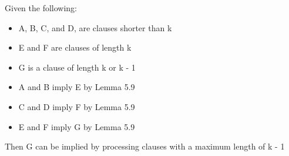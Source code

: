 \documentclass[manuscript]{acmart}
\begin{document}
    \begin{lemma}
        Given the following:
        \begin{itemize}
            \item A, B, C, and D, are clauses shorter than k
            \item E and F are clauses of length k
            \item G is a clause of length k or k - 1
            \item A and B imply E by Lemma 5.9
            \item C and D imply F by Lemma 5.9
            \item E and F imply G by Lemma 5.9
        \end{itemize}
        Then G can be implied by processing clauses with a maximum length of k - 1
    \end{lemma}
\end{document}

